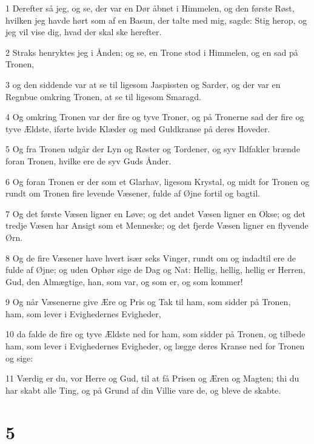 \par 1 Derefter så jeg, og se, der var en Dør åbnet i Himmelen, og den første Røst, hvilken jeg havde hørt som af en Basun, der talte med mig, sagde: Stig herop, og jeg vil vise dig, hvad der skal ske herefter.
\par 2 Straks henryktes jeg i Ånden; og se, en Trone stod i Himmelen, og en sad på Tronen,
\par 3 og den siddende var at se til ligesom Jaspissten og Sarder, og der var en Regnbue omkring Tronen, at se til ligesom Smaragd.
\par 4 Og omkring Tronen var der fire og tyve Troner, og på Tronerne sad der fire og tyve Ældste, iførte hvide Klæder og med Guldkranse på deres Hoveder.
\par 5 Og fra Tronen udgår der Lyn og Røster og Tordener, og syv Ildfakler brænde foran Tronen, hvilke ere de syv Guds Ånder.
\par 6 Og foran Tronen er der som et Glarhav, ligesom Krystal, og midt for Tronen og rundt om Tronen fire levende Væsener, fulde af Øjne fortil og bagtil.
\par 7 Og det første Væsen ligner en Løve; og det andet Væsen ligner en Okse; og det tredje Væsen har Ansigt som et Menneske; og det fjerde Væsen ligner en flyvende Ørn.
\par 8 Og de fire Væsener have hvert især seks Vinger, rundt om og indadtil ere de fulde af Øjne; og uden Ophør sige de Dag og Nat: Hellig, hellig, hellig er Herren, Gud, den Almægtige, han, som var, og som er, og som kommer!
\par 9 Og når Væsenerne give Ære og Pris og Tak til ham, som sidder på Tronen, ham, som lever i Evighedernes Evigheder,
\par 10 da falde de fire og tyve Ældste ned for ham, som sidder på Tronen, og tilbede ham, som lever i Evighedernes Evigheder, og lægge deres Kranse ned for Tronen og sige:
\par 11 Værdig er du, vor Herre og Gud, til at få Prisen og Æren og Magten; thi du har skabt alle Ting, og på Grund af din Villie vare de, og bleve de skabte.

\chapter{5}

